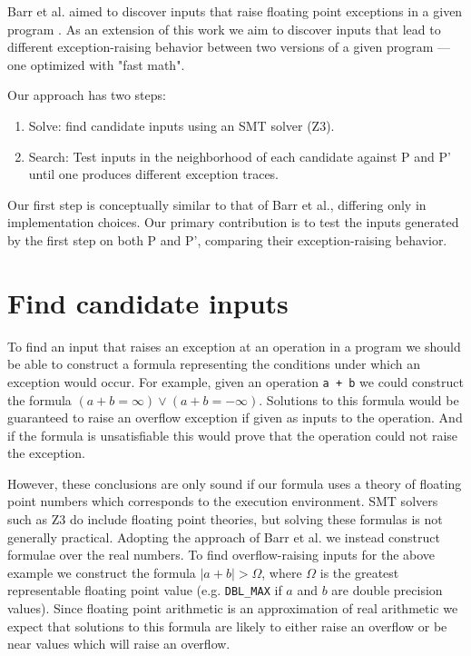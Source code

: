 \documentclass{article}
\begin{document}
Barr et al. aimed to discover inputs that raise floating point exceptions
in a given program \cite{barr_automatic_2013}. As an extension of this work we
aim to discover inputs that lead to different exception-raising behavior between
two versions of a given program — one optimized with "fast math".

Our approach has two steps:
\begin{enumerate}
  \item Solve: find candidate inputs using an SMT solver (Z3).
  \item Search: Test inputs in the neighborhood of each candidate against P and
P' until one produces different exception traces.
\end{enumerate}

Our first step is conceptually similar to that of Barr et al., differing
only in implementation choices. Our primary contribution is to test the inputs
generated by the first step on both P and P', comparing their exception-raising
behavior.

\section{Find candidate inputs}

To find an input that raises an exception at an operation in a program we should
be able to construct a formula representing the conditions under which an
exception would occur. For example, given an operation \texttt{a + b} we could
construct the formula $(a + b = \infty) \lor (a + b = -\infty)$. Solutions to
this formula would be guaranteed to raise an overflow exception if given as
inputs to the operation. And if the formula is unsatisfiable this would prove
that the operation could not raise the exception.

However, these conclusions are only sound if our formula uses a theory of
floating point numbers which corresponds to the execution environment. SMT
solvers such as Z3 do include floating point theories, but solving these
formulas is not generally practical. Adopting the approach of Barr et al. we
instead construct formulae over the real numbers. To find overflow-raising
inputs for the above example we construct the formula $|a + b| > \Omega$, where
$\Omega$ is the greatest representable floating point value (e.g.
\texttt{DBL\_MAX} if $a$ and $b$ are double precision values). Since floating
point arithmetic is an approximation of real arithmetic we expect that solutions
to this formula are likely to either raise an overflow or be near values which
will raise an overflow.
\end{document}
